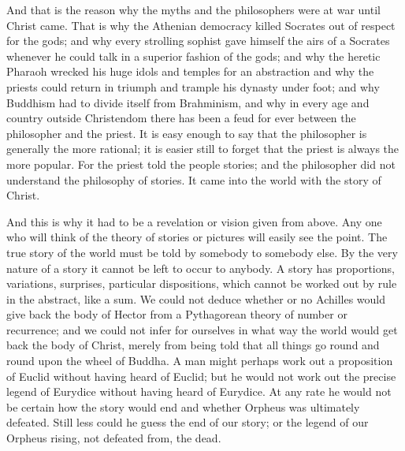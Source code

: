 And that is the reason why the myths and the philosophers were at war until Christ came. That is why the Athenian democracy killed Socrates out of respect for the gods; and why every strolling sophist gave himself the airs of a Socrates whenever he could talk in a superior fashion of the gods; and why the heretic Pharaoh wrecked his huge idols and temples for an abstraction and why the priests could return in triumph and trample his dynasty under foot; and why Buddhism had to divide itself from Brahminism, and why in every age and country outside Christendom there has been a feud for ever between the philosopher and the priest. It is easy enough to say that the philosopher is generally the more rational; it is easier still to forget that the priest is always the more popular. For the priest told the people stories; and the philosopher did not understand the philosophy of stories. It came into the world with the story of Christ.

And this is why it had to be a revelation or vision given from above. Any one who will think of the theory of stories or pictures will easily see the point. The true story of the world must be told by somebody to somebody else. By the very nature of a story it cannot be left to occur to anybody. A story has proportions, variations, surprises, particular dispositions, which cannot be worked out by rule in the abstract, like a sum. We could not deduce whether or no Achilles would give back the body of Hector from a Pythagorean theory of number or recurrence; and we could not infer for ourselves in what way the world would get back the body of Christ, merely from being told that all things go round and round upon the wheel of Buddha. A man might perhaps work out a proposition of Euclid without having heard of Euclid; but he would not work out the precise legend of Eurydice without having heard of Eurydice. At any rate he would not be certain how the story would end and whether Orpheus was ultimately defeated. Still less could he guess the end of our story; or the legend of our Orpheus rising, not defeated from, the dead.

